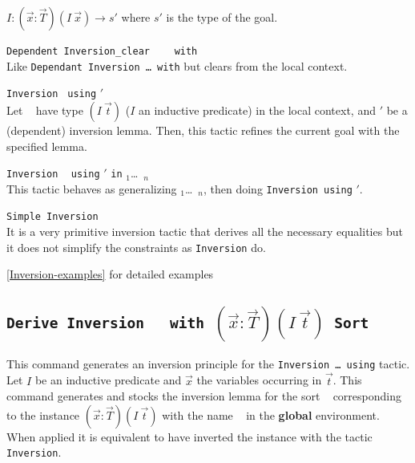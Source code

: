 \begin{Variants}
  $I:(\vec{x}:\vec{T})(I~\vec{x})\to s'$ where $s'$ is the
  type of the goal.
\item \texttt{Dependent Inversion\_clear } \ident~ \texttt{ with } \term\\
  Like \texttt{Dependant Inversion \dots\ with} but clears \ident from
  the local context.
\item \texttt{Inversion} \ident \texttt{ using} \ident$'$ \\
  Let \ident~ have type $(I~\vec{t})$ ($I$ an inductive
  predicate) in the local context, and \ident$'$ be a (dependent) inversion
  lemma. Then, this tactic refines the current goal with the specified
  lemma.
\item \texttt{Inversion} \ident~ \texttt{using} \ident$'$ 
  \texttt{in} \ident$_1$\dots\ \ident$_n$\\
  This tactic behaves as generalizing \ident$_1$\dots\ \ident$_n$,
  then doing \texttt{Inversion}\ident~\texttt{using} \ident$'$.
\item \texttt{Simple Inversion} \ident~\\
  It is a very primitive inversion tactic that derives all the necessary
  equalities  but it does not simplify the  constraints as
  \texttt{Inversion} do.
\end{Variants}

\SeeAlso \ref{Inversion-examples} for detailed examples

\subsection{\tt Derive Inversion \ident~ with
  $(\vec{x}:\vec{T})(I~\vec{t})$ Sort \sort}
\label{Derive-Inversion}

This command generates an inversion principle for the
\texttt{Inversion \dots\ using} tactic.
Let $I$ be an inductive predicate and $\vec{x}$ the variables
occurring in $\vec{t}$. This command generates and stocks the
inversion lemma for the sort \sort~ corresponding to the instance
$(\vec{x}:\vec{T})(I~\vec{t})$ with the name \ident~ in the {\bf
global} environment. When applied it is equivalent to have inverted
the instance with the tactic {\tt Inversion}.

